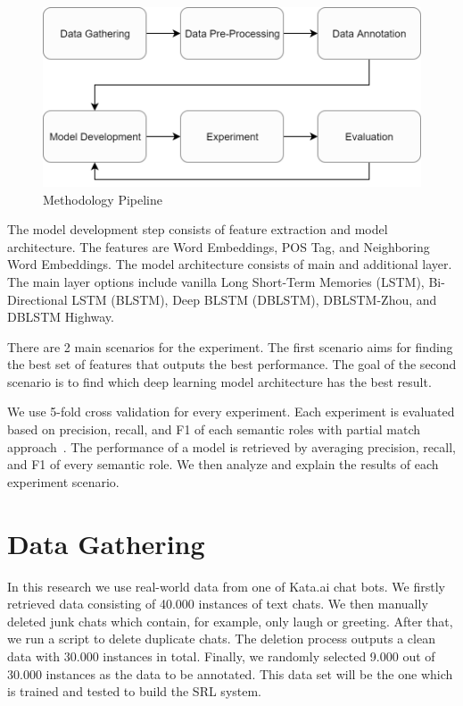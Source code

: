\begin{figure}
	\centering
	\includegraphics[width=\linewidth]{images/pipeline}
	\caption{Methodology Pipeline}
	\label{fig:pipeline}
\end{figure}

The model development step consists of feature extraction and model architecture. The features are Word Embeddings, POS Tag, and Neighboring Word Embeddings. The model architecture consists of main and additional layer. The main layer options include vanilla Long Short-Term Memories (LSTM), Bi-Directional LSTM (BLSTM), Deep BLSTM (DBLSTM), DBLSTM-Zhou, and DBLSTM Highway.

There are 2 main scenarios for the experiment. The first scenario aims for finding the best set of features that outputs the best performance. The goal of the second scenario is to find which deep learning model architecture has the best result.

We use 5-fold cross validation for every experiment. Each experiment is evaluated based on precision, recall, and F1 of each semantic roles with partial match approach~\citep{seki2003probabilistic}. The performance of a model is retrieved by averaging precision, recall, and F1 of every semantic role.  We then analyze and explain the results of each experiment scenario.

\section{Data Gathering}
In this research we use real-world data from one of Kata.ai chat bots. We firstly retrieved data consisting of 40.000 instances of text chats. We then manually deleted junk chats which contain, for example, only laugh or greeting. After that, we run a script to delete duplicate chats. The deletion process outputs a clean data with 30.000 instances in total. Finally, we randomly selected 9.000 out of 30.000 instances as the data to be annotated. This data set will be the one which is trained and tested to build the SRL system.

